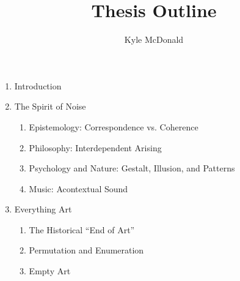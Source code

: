 \documentclass{article}
\title{Thesis Outline}
\author{Kyle McDonald}
\begin{document}
\maketitle

\begin{enumerate}
	\item Introduction
	
	\item The Spirit of Noise
	\begin{enumerate}
		\item Epistemology: Correspondence vs. Coherence
			\cite{Blackburn07}\cite{seti_about_????}\cite{david_correspondence_????}\cite{david_horvitz_flickr:_????}
			\cite{david_horvitz_flickr:_????-1}\cite{young_coherence_????}
		\item Philosophy: Interdependent Arising
			\cite{Hofstadter07}\cite{Koller01}\cite{erik_thiele_tempest_????}\cite{francesco_vianello_reality_????}
			\cite{w._wayt_gibbs_hackers_2009}
		\item Psychology and Nature: Gestalt, Illusion, and Patterns
			\cite{Moore07}\cite{Doczi81}\cite{Hofstadter01}\cite{robin_mckie_secret_2004}
			\cite{alan_dunning_paul_woodrow_and_morley_hollenberg_einsteins_2008}\cite{alexander_bogomolny_kanizsa_????}
			\cite{brian_dunning_facemars_2008}\cite{dan_paluska_holy_2005}\cite{de_lapparent_slice_1986}
			\cite{jochem_van_der_spek_no_2001}\cite{jonathan_feinberg_haiku_????}\cite{michael_bach_dalmatian_2002}
			\cite{michael_m._ross_natural_2007}\cite{padovan_proportion_1999}\cite{rips_equidistant_1994}
			\cite{weisstein_prime_????}\cite{boston.com_religious_????}
		\item Music: Acontextual Sound
			\cite{Bruen04}\cite{Vannort06}\cite{Attali85}\cite{Cage61}\cite{Sangild04}\cite{Cascone00}
			\cite{Hegarty02}\cite{Kahn01}\cite{Russolo04}
	\end{enumerate}
	
	\item Everything Art
	\begin{enumerate}
		\item The Historical ``End of Art''
			\cite{Wright09}\cite{moma_kazimir_2006}\cite{moma_rodchenko_1998}
		\item Permutation and Enumeration
			\cite{boolos_computability_2002}\cite{borges_aleph_2004}\cite{borges_library_2000}
			\cite{christian_scheib_statics_????}\cite{jim_campbell_end_1996}\cite{john_f._simon_jr._every_????}
			\cite{john_f._simon_jr._given:32_1997}\cite{kyle_mcdonald_nandhopper_2008}\cite{kyle_mcdonald_pppd_2009}
			\cite{leander_seige_imagen_????}\cite{leonardo_solaas_magic_????}\cite{matthew_mirapaul_in_1997}
			\cite{michael_aschauer_8-bit_????}\cite{nattiez_music_1990}\cite{remko_scha_every_2001}\cite{sintron_gods_2003}
			\cite{tomczak_all_2009}\cite{tomczak_hardware-based_2009}\cite{alexander_christiaan_jacob_allrgb_2008}
			\cite{allan_mccollum_shapes_2006}\cite{jem_finer_longplayer_????}\cite{john_cage_as_????}\cite{paul_slocum_pi_2007}
			\cite{brian_whitman_eigenradio_2005}\cite{keith_f._lynch_converting_????}
		\item Empty Art
			\cite{larry_j_solomon_sounds_1998}
	\end{enumerate}
	

\end{enumerate}
\end{document}
